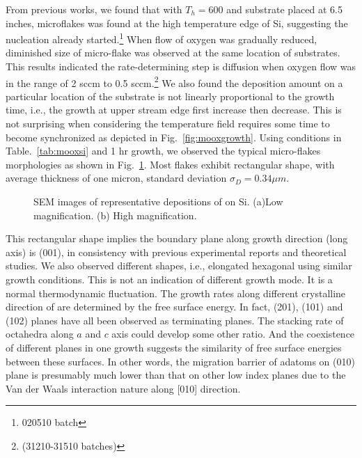 From previous works,\cite{predeep2011} we found that with $T_h = 600$ and substrate placed at 6.5 inches, microflakes was found at the high temperature edge of Si, suggesting the nucleation already started.\footnote{020510 batch} When flow of oxygen was gradually reduced, diminished size of micro-flake was observed at the same location of substrates. This results indicated the rate-determining step is diffusion when oxygen flow was in the range of 2 sccm to 0.5 sccm.\footnote{(31210-31510 batches)} We also found the deposition amount on a particular location of the substrate is not linearly proportional to the growth time, i.e., the growth at upper stream edge first increase then decrease. This is not surprising when considering the temperature field requires some time to become synchronized as depicted in Fig.~\ref{fig:mooxgrowth}. Using conditions in Table.~\ref{tab:mooxsi} and 1 hr growth, we observed the typical micro-flakes morphologies as shown in Fig.~\ref{fig:mosisem}. Most flakes exhibit rectangular shape, with average thickness of one micron, standard deviation $\sigma_D=0.34\mu m$.

\begin{figure}[htb]
\centering
{}\hspace{0.04\textwidth}
\caption[Representative morphologies of  on Si]{SEM images of representative depositions of  on Si. (a)Low magnification. (b) High magnification. }
\label{fig:mosisem}
\end{figure}

This rectangular shape implies the boundary plane along growth direction (long axis) is (001), in consistency with previous experimental reports\cite{Zeng1998,Li2002b} and theoretical studies.\cite{Firment1983,Cora1997} We also observed different shapes, i.e., elongated hexagonal using similar growth conditions. This is not an indication of different growth mode. It is a normal thermodynamic fluctuation. The growth rates along different crystalline direction of  are determined by the free surface energy. In fact, (201), (101) and (102) planes have all been observed as terminating planes.\cite{Zeng1998} The stacking rate of  octahedra along $a$ and $c$ axis could develop some other ratio. And the coexistence of different planes in one growth suggests the similarity of free surface energies between these surfaces. In other words, the migration barrier of adatoms on (010) plane is presumably much lower than that on other low index planes due to the Van der Waals interaction nature along [010] direction.

